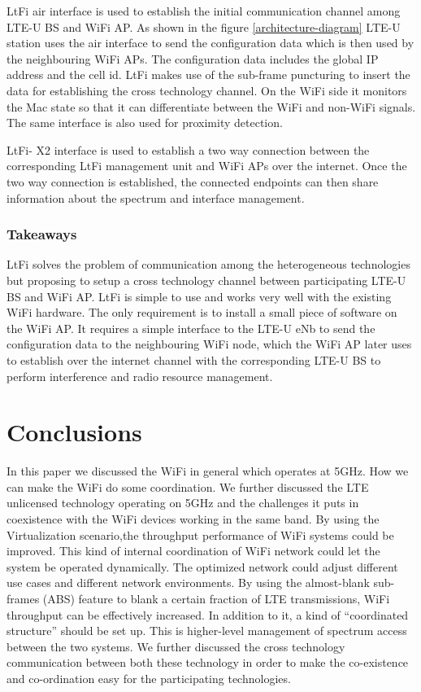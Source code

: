 \documentclass{IEEEtran}
\begin{document}
LtFi air interface is used to establish the initial communication channel among LTE-U BS and WiFi AP. As shown in the figure \ref{architecture-diagram} LTE-U station uses the air interface to send the configuration data which is then used by the neighbouring WiFi APs. The configuration data includes the global IP address and the cell id. LtFi makes use of the sub-frame puncturing to insert the data for establishing the cross technology channel. On the WiFi side it monitors the Mac state so that it can differentiate between the WiFi and non-WiFi signals. The same interface is also used for proximity detection.

LtFi- X2 interface is used to establish a two way connection between the corresponding LtFi management unit and WiFi APs over the internet. Once the two way connection is established, the connected endpoints can then share information about the spectrum and interface management.

\subsubsection{Takeaways}
LtFi solves the problem of communication among the heterogeneous technologies but proposing to setup a cross technology channel between participating LTE-U BS and WiFi AP. LtFi is simple to use and works very well with the existing WiFi hardware. The only requirement is to install a small piece of software on the WiFi AP. It requires a simple interface to the LTE-U eNb to send the configuration data to the neighbouring WiFi node, which the WiFi AP later uses to establish over the internet channel with the corresponding LTE-U BS to perform interference and radio resource management. 

\section{Conclusions}
In this paper we discussed the WiFi in general which operates at 5GHz. How we can make the WiFi do some  coordination. We further discussed the LTE unlicensed technology operating on 5GHz and the challenges it puts in coexistence with the WiFi devices working in the same band. By using the Virtualization scenario,the throughput performance of WiFi systems could be improved. This kind of internal coordination of WiFi network could let the system be operated dynamically. The optimized network could adjust different use cases and different network environments. By using the almost-blank sub-frames (ABS) feature to blank a certain fraction of LTE transmissions, WiFi throughput can be effectively increased. In addition to it, a kind of “coordinated structure” should be set up. This is higher-level management of spectrum access between the two systems. We further discussed the cross technology communication between both these technology in order to make the co-existence and co-ordination easy for the participating technologies.

\printbibliography
\end{document}

